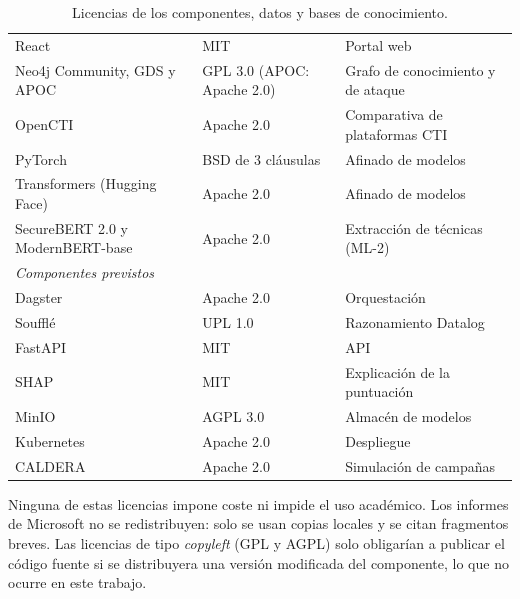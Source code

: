 \begin{table}[H]
\begin{tabularx}{\textwidth}{|l|l|X|}
React & MIT & Portal web \\
Neo4j Community, GDS y APOC & GPL 3.0 (APOC: Apache 2.0) & Grafo de conocimiento y de ataque \\
OpenCTI & Apache 2.0 & Comparativa de plataformas CTI \\
PyTorch & BSD de 3 cláusulas & Afinado de modelos \\
Transformers (Hugging Face) & Apache 2.0 & Afinado de modelos \\
SecureBERT 2.0 y ModernBERT-base & Apache 2.0 & Extracción de técnicas (ML-2) \\
\hline
\multicolumn{3}{|l|}{\textit{Componentes previstos}} \\
\hline
Dagster & Apache 2.0 & Orquestación \\
Soufflé & UPL 1.0 & Razonamiento Datalog \\
FastAPI & MIT & API \\
SHAP & MIT & Explicación de la puntuación \\
MinIO & AGPL 3.0 & Almacén de modelos \\
Kubernetes & Apache 2.0 & Despliegue \\
CALDERA & Apache 2.0 & Simulación de campañas \\
\hline
\end{tabularx}
\caption{Licencias de los componentes, datos y bases de conocimiento.}
\label{tab:licencias}
\end{table}

Ninguna de estas licencias impone coste ni impide el uso académico. Los informes de Microsoft
no se redistribuyen: solo se usan copias locales y se citan fragmentos breves. Las licencias de tipo
\textit{copyleft} (GPL y AGPL) solo obligarían a publicar el código fuente si se
distribuyera una versión modificada del componente, lo que no ocurre en este trabajo.

